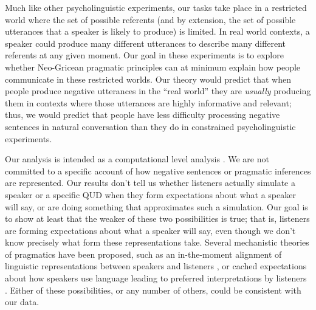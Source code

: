\documentclass[man, floatsintext, noapacite]{apa6}
\begin{document}
Much like other psycholinguistic experiments, our tasks take place in a restricted world where the set of possible referents (and by extension, the set of possible utterances that a speaker is likely to produce) is limited. In real world contexts, a speaker could produce many different utterances to describe many different referents at any given moment. Our goal in these experiments is to explore whether Neo-Gricean pragmatic principles can at minimum explain how people communicate in these restricted worlds. Our theory would predict that when people produce negative utterances in the ``real world'' they are \textit{usually} producing them in contexts where those utterances are highly informative and relevant; thus, we would predict that people have less difficulty processing negative sentences in natural conversation than they do in constrained psycholinguistic experiments.


Our analysis is intended as a computational level analysis \cite{marr1982}. We are not committed to a specific account of how negative sentences or pragmatic inferences are represented. Our results don't tell us whether listeners actually simulate a speaker or a specific QUD when they form expectations about what a speaker will say, or are doing something that approximates such a simulation. Our goal is to show at least that the weaker of these two possibilities is true; that is, listeners are forming expectations about what a speaker will say, even though we don't know precisely what form these representations take. Several mechanistic theories of pragmatics have been proposed, such as an in-the-moment alignment of linguistic representations between speakers and listeners \cite{pickering2004}, or cached expectations about how speakers use language leading to preferred interpretations by listeners \cite{levinson2000}. Either of these possibilities, or any number of others, could be consistent with our data. 
\end{document}
